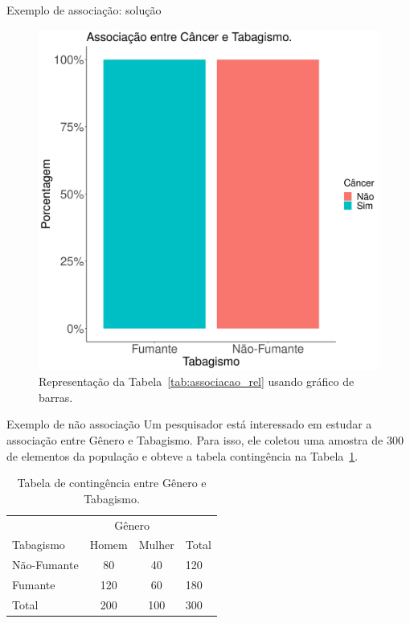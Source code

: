 \documentclass[9pt]{beamer}
\begin{document}
\begin{frame}{Exemplo de associação: solução}

\begin{figure}[htbp]
	\centering
	\includegraphics[width = 0.75\linewidth]{figures/associacao.png}
	\caption{Representação da Tabela~\ref{tab:associacao_rel} usando gráfico de barras.}
	\label{tab:graph-associacao}
\end{figure}
\end{frame}

\begin{frame}{Exemplo de não associação}
Um pesquisador está interessado em estudar a associação entre Gênero e Tabagismo. Para isso, ele coletou uma amostra de 300 de elementos da população e obteve a tabela contingência na Tabela~\ref{tab:nao-associacao}.
\begin{table}[htbp]
	\centering
	\caption{Tabela de contingência entre Gênero e Tabagismo.}
	\label{tab:nao-associacao}
	\begin{tabular}{l|cc|l}
		\toprule[0.05cm]
		& \multicolumn{2}{|c|}{Gênero} & \\ \cmidrule{2-3}
		Tabagismo & Homem & Mulher & Total\\ \midrule[0.05cm]
		Não-Fumante & 80 & 40 & 120\\
		Fumante & 120 & 60 & 180\\ \midrule[0.05cm]
		Total & 200 & 100 & 300\\ \bottomrule[0.05cm]
	\end{tabular}
\end{table}
\end{frame}
\end{document}
